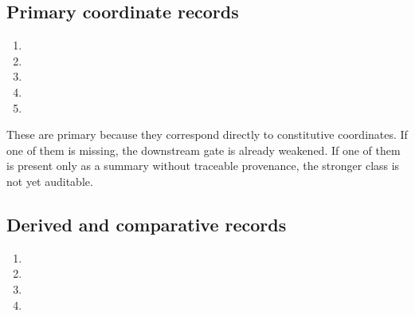 \documentclass[11pt,a4paper]{article}
\theoremstyle{definition}
\begin{document}
\subsection{Primary coordinate records}
\begin{enumerate}[leftmargin=1.5em]
\item \texttt{\allowbreak{}\allowbreak{}}
\item \texttt{\allowbreak{}\allowbreak{}\allowbreak{}\allowbreak{}}
\item \texttt{\allowbreak{}\allowbreak{}\allowbreak{}\allowbreak{}}
\item \texttt{\allowbreak{}\allowbreak{}\allowbreak{}\allowbreak{}}
\item \texttt{\allowbreak{}\allowbreak{}\allowbreak{}\allowbreak{}}
\end{enumerate}

These are primary because they correspond directly to constitutive coordinates. If one of them is missing, the downstream gate is already weakened. If one of them is present only as a summary without traceable provenance, the stronger class is not yet auditable.

\subsection{Derived and comparative records}
\begin{enumerate}[leftmargin=1.5em]
\item \texttt{\allowbreak{}\allowbreak{}\allowbreak{}\allowbreak{}}
\item \texttt{\allowbreak{}\allowbreak{}\allowbreak{}}
\item \texttt{\allowbreak{}\allowbreak{}\allowbreak{}\allowbreak{}}
\item \texttt{\allowbreak{}\allowbreak{}\allowbreak{}}
\end{enumerate}
\end{document}
